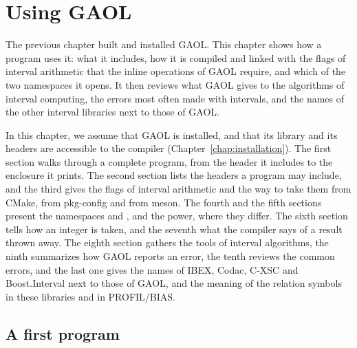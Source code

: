 \chapter{Using GAOL}\label{chap:overview}

The previous chapter built and installed GAOL. This chapter shows how a
program uses it: what it includes, how it is compiled and linked with the
flags of interval arithmetic that the inline operations of GAOL require, and
which of the two namespaces it opens. It then reviews what GAOL gives to the
algorithms of interval computing, the errors most often made with intervals,
and the names of the other interval libraries next to those of GAOL.

\medskip
In this chapter, we assume that GAOL is installed, and that its library and
its headers are accessible to the compiler (Chapter~\ref{chap:installation}).
The first section walks through a complete program, from the header it
includes to the enclosure it prints. The second section lists the headers a
program may include, and the third gives the flags of interval arithmetic and
the way to take them from CMake, from pkg-config and from meson. The fourth
and the fifth sections present the namespaces  and
, and the power, where they differ. The sixth section
tells how an integer is taken, and the seventh what the compiler says of a
result thrown away. The eighth section gathers the tools of interval
algorithms, the ninth summarizes how GAOL reports an error, the tenth reviews
the common errors, and the last one gives the names of IBEX, Codac, C-XSC and
Boost.Interval next to those of GAOL, and the meaning of the relation symbols
in these libraries and in PROFIL/BIAS.

\section{A first program}\label{sec:first-program}
%

